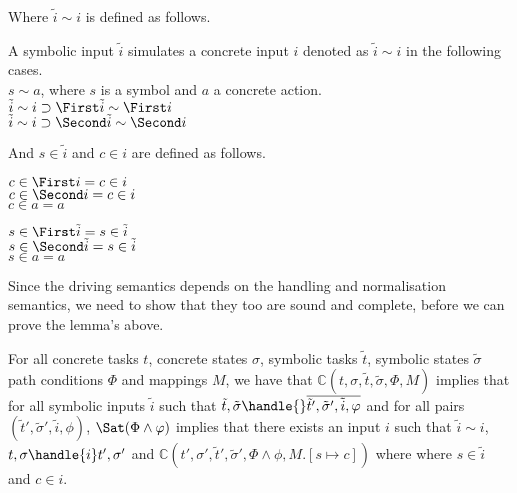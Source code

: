 Where $\tilde{i}\sim i$ is defined as follows.

\begin{definition}
  A symbolic input $\tilde{i}$ simulates a concrete input $i$ denoted as $\tilde{i}\sim i$ in the following cases.\\
  $s\sim a$, where $s$ is a symbol and $a$ a concrete action.\\
  $\tilde{i}\sim i\implies \First \tilde{i} \sim \First i$\\
  $\tilde{i}\sim i\implies \Second \tilde{i} \sim \Second i$
\end{definition}

And $s\in \tilde{i}$ and $c\in i$ are defined as follows.

\begin{definition}
  $c\in \First i = c\in i $\\
  $c\in \Second i = c\in i $\\
  $c\in a = a $
\end{definition}

\begin{definition}
  $s\in \First \tilde{i} = s\in \tilde{i} $\\
  $s\in \Second \tilde{i} = s\in \tilde{i} $\\
  $s\in a = a $
\end{definition}

Since the driving semantics depends on the handling and normalisation semantics, we need to show that they too are sound and complete, before we can prove the lemma's above.


\begin{lemma}
  \label{lem:soundhandle}

  For all concrete tasks $t$, concrete states $\sigma$, symbolic tasks $\tilde{t}$, symbolic states $\tilde{\sigma}$ path conditions $\Phi$ and mappings $M$,
  we have that $\mathds{C}(t,\sigma,\tilde{t},\tilde{\sigma},\Phi,M)$ implies
  that for all symbolic inputs $\tilde{i}$ such that $\tilde{t},\tilde{\sigma}\handle{}\overline{\tilde{t}',\tilde{\sigma}',\tilde{i},\phi}$ and
  for all pairs $(\tilde{t}',\tilde{\sigma}',\tilde{i},\phi)$,
  $\Sat(\Phi\land\phi)$ implies that there exists an input $i$ such that $\tilde{i}\sim i$,  $t,\sigma\handle{i}t',\sigma'$ and $\mathds{C}(t',\sigma',\tilde{t}',\tilde{\sigma}',\Phi\land\phi,M.[s\mapsto c])$ where where $s\in\tilde{i}$ and $c\in i$.

\end{lemma}



